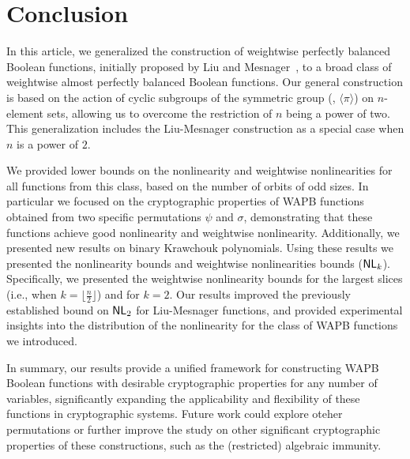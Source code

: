 \documentclass{llncs}
\begin{document}
\section{Conclusion}\label{sec:con}
In this article, we generalized the construction of weightwise perfectly balanced Boolean functions, initially proposed by Liu and Mesnager~\cite{DCC:LiuMes19}, to a broad class of weightwise almost perfectly balanced Boolean functions. 
Our general construction is based on the action of cyclic subgroups of the symmetric group (\ie, $\langle \pi \rangle$) on $n$-element sets, allowing us to overcome the restriction of $n$ being a power of two. 
This generalization includes the Liu-Mesnager construction as a special case when $n$ is a power of $2$.

We provided lower bounds on the nonlinearity and weightwise nonlinearities for all functions from this class, based on the number of orbits of odd sizes. 
In particular we focused on the cryptographic properties of WAPB functions obtained from two specific permutations $\psi$ and $\sigma$, demonstrating that these functions achieve good nonlinearity and weightwise nonlinearity. 
Additionally, we presented new results on binary Krawchouk polynomials.
Using these results we presented the nonlinearity bounds and weightwise nonlinearities bounds ($\mathsf{NL}_{k}$). Specifically, we presented the weightwise nonlinearity bounds for the largest slices (i.e., when $k = \lfloor\frac{n}{2}\rfloor$) and for $k = 2$. Our results improved the previously established bound on $\mathsf{NL}_{2}$ for Liu-Mesnager functions, and provided experimental insights into the distribution of the nonlinearity for the class of WAPB functions we introduced.

In summary, our results provide a unified framework for constructing WAPB Boolean functions with desirable cryptographic properties for any number of variables, significantly expanding the applicability and flexibility of these functions in cryptographic systems. Future work could explore oteher permutations or further improve the study on other significant cryptographic properties of these constructions, such as the (restricted) algebraic immunity.






\ifnum{}
%


\else


\end{document}

